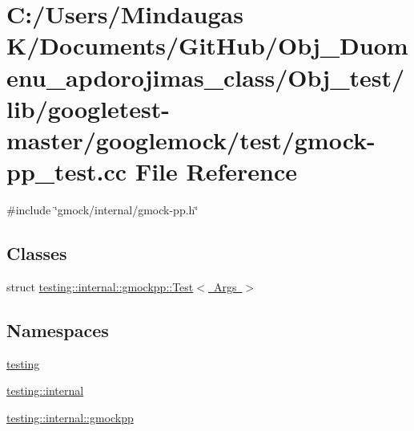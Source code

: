 \hypertarget{_obj__test_2lib_2googletest-master_2googlemock_2test_2gmock-pp__test_8cc}{}\section{C\+:/\+Users/\+Mindaugas K/\+Documents/\+Git\+Hub/\+Obj\+\_\+\+Duomenu\+\_\+apdorojimas\+\_\+class/\+Obj\+\_\+test/lib/googletest-\/master/googlemock/test/gmock-\/pp\+\_\+test.cc File Reference}
\label{_obj__test_2lib_2googletest-master_2googlemock_2test_2gmock-pp__test_8cc}
{\ttfamily \#include \char`\"{}gmock/internal/gmock-\/pp.\+h\char`\"{}}\newline
\subsection*{Classes}
\begin{DoxyCompactItemize}
\item 
struct \mbox{\hyperlink{structtesting_1_1internal_1_1gmockpp_1_1_test}{testing\+::internal\+::gmockpp\+::\+Test$<$ Args $>$}}
\end{DoxyCompactItemize}
\subsection*{Namespaces}
\begin{DoxyCompactItemize}
\item 
 \mbox{\hyperlink{namespacetesting}{testing}}
\item 
 \mbox{\hyperlink{namespacetesting_1_1internal}{testing\+::internal}}
\item 
 \mbox{\hyperlink{namespacetesting_1_1internal_1_1gmockpp}{testing\+::internal\+::gmockpp}}
\end{DoxyCompactItemize}
